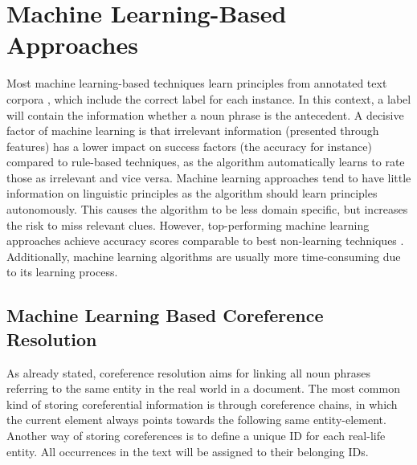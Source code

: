 \section{Machine Learning-Based Approaches}

Most machine learning-based techniques learn principles from annotated text corpora \citep{soon2001machine, bergsma2005automatic}, which include the correct label for each instance. In this context, a label will contain the information whether a noun phrase is the antecedent. A decisive factor of machine learning is that irrelevant information (presented through features) has a lower impact on success factors (the accuracy for instance) compared to rule-based techniques, as the algorithm automatically learns to rate those as irrelevant and vice versa. Machine learning approaches tend to have little information on linguistic principles as the algorithm should learn principles autonomously. This causes the algorithm to be less domain specific, but increases the risk to miss relevant clues. However, top-performing machine learning approaches achieve accuracy scores comparable to best non-learning techniques \citep{soon2001machine}. \\
Additionally, machine learning algorithms are usually more time-consuming due to its learning process.

\subsection{Machine Learning Based Coreference Resolution}
\label{soon2001traininginstances}

As already stated, coreference resolution aims for linking all noun phrases referring to the same entity in the real world in a document. The most common kind of storing coreferential information is through coreference chains, in which the current element always points towards the following same entity-element. Another way of storing coreferences is to define a unique ID for each real-life entity. All occurrences in the text will be assigned to their belonging IDs.

